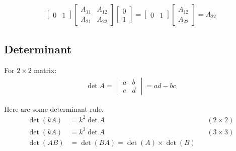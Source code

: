 \documentclass[../main.tex]{subfiles}
\begin{document}
\begin{align*}
\begin{bmatrix}
		0&1	
	\end{bmatrix} 
	\begin{bmatrix}
		A_{11}&A_{12}\\
		A_{21}&A_{22}
	\end{bmatrix}
	\begin{bmatrix}
		0\\
		1
	\end{bmatrix} 
	=
	\begin{bmatrix}
		0&1
	\end{bmatrix}
	\begin{bmatrix}
		A_{12}\\
		A_{22}
	\end{bmatrix}
	=A_{22}
\end{align*}

\subsection{Determinant} For $2\times 2$ matrix:
\begin{align*}
	\det A=\begin{vmatrix}
		       a & b \\
		       c & d
	       \end{vmatrix}=ad-bc
\end{align*}

Here are some determinant rule.
\begin{align*}
	\det(kA) & =k^2\det A                      &  & (2\times2) \\
	\det(kA) & =k^3\det A                      &  & (3\times3) \\
	\det(AB) & =\det(BA)=\det(A)\times\det (B)
\end{align*}
\end{document}
